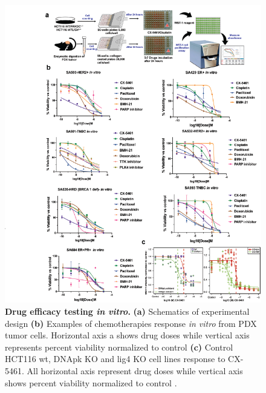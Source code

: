\begin{figure}
	\centering
	\includegraphics[width=\textwidth]{Figures/chap3/invitro.png}
	\caption[Drug efficacy testing \textit{in vitro} ]
	{\small
	    \textbf{Drug efficacy testing \textit{in vitro}.}
	    \textbf{(a)} Schematics of experimental design
	    \textbf{(b)} Examples of chemotherapies response \textit{in vitro} from PDX tumor cells. Horizontal axis a shows drug doses while vertical axis represents percent viability normalized to control
	    \textbf{(c)} Control HCT116 wt, DNApk KO and lig4 KO cell lines response to CX-5461. All horizontal axis represent drug doses while vertical axis shows percent viability normalized to control \cite{xu2017cx}.
	}
	\label{fig:invitro}
\end{figure}





